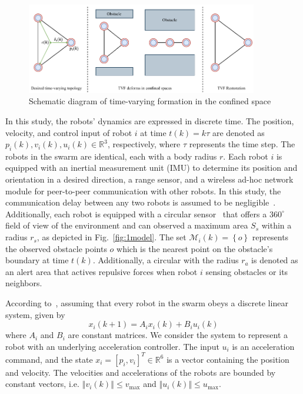\begin{figure}
    \centering
    \includegraphics[width=0.9\textwidth]{paper2/images/problem.pdf}
    \caption{Schematic diagram of time-varying formation in the confined space}
    \label{fig:1problem}
\end{figure}
In this study, the robots' dynamics are expressed in discrete time. The position, velocity, and control input of robot $i$ at time $t(k) = k\tau$ are denoted as $p_i(k), v_i(k), u_i(k) \in \mathbb{R}^3$, respectively, where $\tau$ represents the time step. The robots in the swarm are identical, each with a body radius $r$. Each robot $i$ is equipped with an inertial measurement unit (IMU) to determine its position and orientation in a desired direction, a range sensor, and a wireless ad-hoc network module for peer-to-peer communication with other robots. In this study, the communication delay between any two robots is assumed to be negligible~\cite{AlonsoMora2018,9527169}. Additionally, each robot is equipped with a circular sensor~\cite{8716301} that offers a $360^\circ$ field of view of the environment and can observed a maximum area $S_s$ within a radius $r_s$, as depicted in Fig.~\ref{fig:1model}. The set $\mathcal{M}_i(k) = \left\{o\right\}$ represents the observed obstacle points $o$ which is the nearest point on the obstacle's boundary at time $t(k)$. Additionally, a circular with the radius $r_a$ is denoted as an alert area that actives repulsive forces when robot $i$ sensing obstacles or its neighbors.

According to~\cite{Dong2015}, assuming that every robot in the swarm obeys a discrete linear system, given by
\begin{equation}
    x_i(k+1)=A_ix_i(k) + B_iu_i(k)
    \label{eqn:1model}
\end{equation}
where $A_i$ and $B_i$ are constant matrices. We consider the system to represent a robot with an underlying acceleration controller. The input $u_i$ is an acceleration command, and the state $x_i=\left[p_i,v_i\right]^T\in\mathbb{R}^6$ is a vector containing the position and velocity. The velocities and accelerations of the robots are bounded by constant vectors, i.e. $\left\Vert v_i(k)\right\Vert\leq v_\text{max}$ and $\left\Vert u_i(k)\right\Vert\leq u_\text{max}$.

